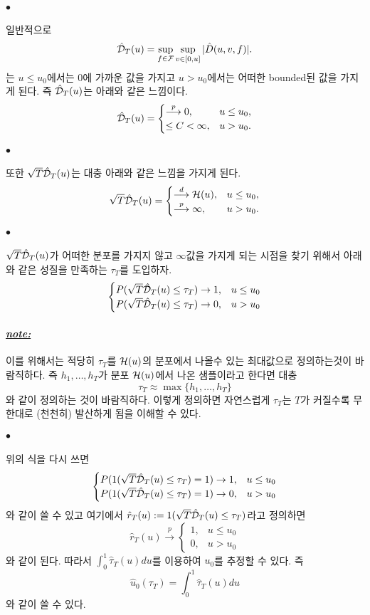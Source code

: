 \documentclass[12pt,oneside,english]{book}
\def\ck{\paragraph{\Large$\bullet$}\Large}
\def\note{\paragraph{\Large\textit{\underline{note:}}}\Large}
\begin{document}
\ck 일반적으로 
$$\hat{\cal D}_T(u)=\sup_{f \in {\cal F}}\sup_{v \in [0,u]} |\hat{D}(u,v,f)|.$$
는 $u\leq u_0$에서는 0에 가까운 값을 가지고 $u>u_0$에서는 어떠한 bounded된 값을 가지게 된다. 즉 $\hat{\cal D}_T(u)$는 아래와 같은 느낌이다. 
$$\hat{\cal D}_T(u)=\begin{cases}
\overset{p}{\longrightarrow} 0 ,& u\leq u_0, \\ 
\leq C < \infty, & u>u_0.
\end{cases}$$

\ck 또한 $\sqrt{T}\hat{\cal D}_T(u)$는 대충 아래와 같은 느낌을 가지게 된다. 
$$\sqrt{T}\hat{\cal D}_T(u)=\begin{cases}
\overset{d}{\longrightarrow} {\cal H}(u) ,& u\leq u_0, \\ 
\overset{p}{\longrightarrow} \infty, & u>u_0.
\end{cases}$$

\ck $\sqrt{T}\hat{\cal D}_T(u)$가 어떠한 분포를 가지지 않고 $\infty$값을 가지게 되는 시점을 찾기 위해서 아래와 같은 성질을 만족하는 $\tau_T$를 도입하자. 
$$\begin{cases}
P(\sqrt{T}\hat{\cal D}_T(u)\leq \tau_T) \rightarrow 1, &u\leq u_0 \\ 
P(\sqrt{T}\hat{\cal D}_T(u)\leq \tau_T) \rightarrow 0, &u > u_0
\end{cases}$$

\note 이를 위해서는 적당히 $\tau_T$를 ${\cal H}(u)$의 분포에서 나올수 있는 최대값으로 정의하는것이 바람직하다. 즉 $h_1,\dots,h_T$가 분포 ${\cal H}(u)$에서 나온 샘플이라고 한다면 대충 
$$\tau_T \approx \max\{h_1,\dots,h_T\}$$
와 같이 정의하는 것이 바람직하다. 이렇게 정의하면 자연스럽게 $\tau_T$는 $T$가 커질수록 무한대로 (천천히) 발산하게 됨을 이해할 수 있다.

\ck 위의 식을 다시 쓰면 
$$\begin{cases}
P(1(\sqrt{T}\hat{\cal D}_T(u)\leq \tau_T)=1) \rightarrow 1, &u\leq u_0 \\ 
P(1(\sqrt{T}\hat{\cal D}_T(u)\leq \tau_T)=1) \rightarrow 0, &u > u_0
\end{cases}$$
와 같이 쓸 수 있고 여기에서 $\hat{r}_T(u):=1(\sqrt{T}\hat{\cal D}_T(u)\leq \tau_T)$라고 정의하면 
$$\hat{r}_T(u) \overset{p}{\longrightarrow} \begin{cases}
1, & u\leq u_0 \\
0, & u>u_0
\end{cases}$$
와 같이 된다. 따라서 $\int_0^1\hat{\tau}_T(u)du$를 이용하여 $u_0$를 추정할 수 있다. 즉
$$\hat{u}_0(\tau_T)=\int_0^1\hat{\tau}_T(u)du$$
와 같이 쓸 수 있다. 
\end{document}
